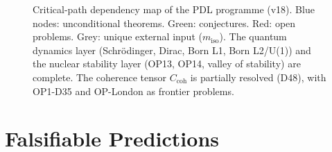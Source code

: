 \documentclass[11pt,a4paper]{article}
\theoremstyle{plain}
\theoremstyle{definition}
\theoremstyle{remark}
\newcommand{\Ccoh}{C_{\mathrm{coh}}}
\begin{document}
\begin{figure}[H]
{%
}
\caption{Critical-path dependency map of the PDL programme (v18). \textcolor{proofblue}{Blue nodes}: unconditional theorems. \textcolor{conjecturegreen}{Green}: conjectures. \textcolor{openproblemred}{Red}: open problems. Grey: unique external input ($m_{\mathrm{iso}}$). The quantum dynamics layer (Schr\"odinger, Dirac, Born L1, Born L2/U(1)) and the nuclear stability layer (OP13, OP14, valley of stability) are complete. The coherence tensor $\Ccoh$ is partially resolved (D48), with OP1-D35 and OP-London as frontier problems.}
\label{fig:dependency}
\end{figure}

\newpage

\section{Falsifiable Predictions}
\label{sec:predictions}
\end{document}
